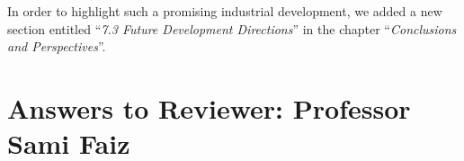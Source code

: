 	In order to highlight such a promising industrial development, we added a new section entitled 
	“\textit{7.3 Future Development Directions}” in the chapter “\textit{Conclusions and Perspectives}”.


\setcounter{commentNum}{0}
\section*{Answers to Reviewer: Professor Sami Faiz}



